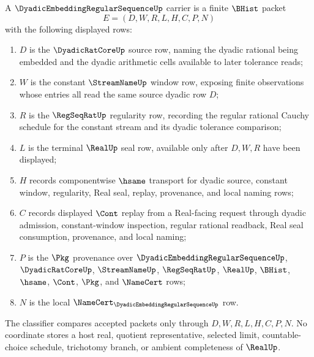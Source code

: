 \begin{definition}
\label{def:dyadic-embedding-regular-sequence-carrier}
A $\DyadicEmbeddingRegularSequenceUp$ carrier is a finite $\BHist$ packet
$$
E=(D,W,R,L,H,C,P,N)
$$
with the following displayed rows:
\begin{enumerate}
\item $D$ is the $\DyadicRatCoreUp$ source row, naming the dyadic rational being embedded and the dyadic arithmetic cells available to later tolerance reads;
\item $W$ is the constant $\StreamNameUp$ window row, exposing finite observations whose entries all read the same source dyadic row $D$;
\item $R$ is the $\RegSeqRatUp$ regularity row, recording the regular rational Cauchy schedule for the constant stream and its dyadic tolerance comparison;
\item $L$ is the terminal $\RealUp$ seal row, available only after $D,W,R$ have been displayed;
\item $H$ records componentwise $\hsame$ transport for dyadic source, constant window, regularity, Real seal, replay, provenance, and local naming rows;
\item $C$ records displayed $\Cont$ replay from a Real-facing request through dyadic admission, constant-window inspection, regular rational readback, Real seal consumption, provenance, and local naming;
\item $P$ is the $\Pkg$ provenance over $\DyadicEmbeddingRegularSequenceUp$, $\DyadicRatCoreUp$, $\StreamNameUp$, $\RegSeqRatUp$, $\RealUp$, $\BHist$, $\hsame$, $\Cont$, $\Pkg$, and $\NameCert$ rows;
\item $N$ is the local $\NameCert_{\DyadicEmbeddingRegularSequenceUp}$ row.
\end{enumerate}
The classifier compares accepted packets only through $D,W,R,L,H,C,P,N$. No coordinate stores a host real, quotient representative, selected limit, countable-choice schedule, trichotomy branch, or ambient completeness of $\RealUp$.
\end{definition}

